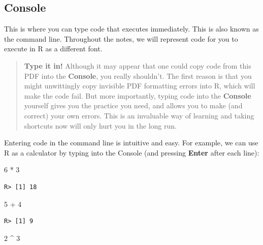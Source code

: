 \documentclass[
]{book}
\newenvironment{Shaded}{\begin{snugshade}}{\end{snugshade}}
\newcommand{\DecValTok}[1]{\textcolor[rgb]{0.00,0.00,0.81}{#1}}
\newcommand{\SpecialCharTok}[1]{\textcolor[rgb]{0.00,0.00,0.00}{#1}}
\begin{document}
\hypertarget{console}{%
\subsection{Console}\label{console}}

This is where you can type code that executes immediately. This is also known as the command line. Throughout the notes, we will represent code for you to execute in R as a different font.

\begin{quote}
\textbf{Type it in!}
Although it may appear that one could copy code from this PDF into the \textbf{Console}, you really shouldn't. The first reason is that you might unwittingly copy invisible PDF formatting errors into R, which will make the code fail. But more importantly, typing code into the \textbf{Console} yourself gives you the practice you need, and allows you to make (and correct) your own errors. This is an invaluable way of learning and taking shortcuts now will only hurt you in the long run.
\end{quote}

Entering code in the command line is intuitive and easy. For example, we can use R as a calculator by typing into the Console (and pressing \textbf{Enter} after each line):

\begin{Shaded}
\begin{Highlighting}[]
\DecValTok{6} \SpecialCharTok{*} \DecValTok{3}
\end{Highlighting}
\end{Shaded}

\begin{verbatim}
R> [1] 18
\end{verbatim}

\begin{Shaded}
\begin{Highlighting}[]
\DecValTok{5} \SpecialCharTok{+} \DecValTok{4}
\end{Highlighting}
\end{Shaded}

\begin{verbatim}
R> [1] 9
\end{verbatim}

\begin{Shaded}
\begin{Highlighting}[]
\DecValTok{2} \SpecialCharTok{\^{}} \DecValTok{3}
\end{Highlighting}
\end{Shaded}
\end{document}
